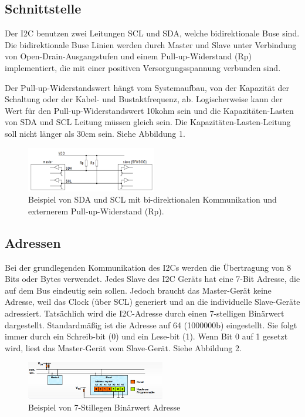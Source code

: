 \documentclass[conference]{IEEEtran}
\begin{document}
\subsection{Schnittstelle}
Der I2C benutzen zwei Leitungen SCL und SDA, welche bidirektionale Buse sind. Die bidirektionale Buse Linien werden durch Master und Slave unter Verbindung von Open-Drain-Ausgangstufen und einem Pull-up-Widerstand (Rp) implementiert, die mit einer positiven Versorgungsspannung verbunden sind.

Der Pull-up-Widerstandswert hängt vom Systemaufbau, von der Kapazität der Schaltung oder der Kabel- und Bustaktfrequenz, ab. Logischerweise kann der Wert für den Pull-up-Widerstandswert 10kohm sein und die Kapazitäten-Lasten von SDA und SCL Leitung müssen gleich sein. Die Kapazitäten-Lasten-Leitung soll nicht länger als 30cm sein.  Siehe Abbildung 1.

\begin{figure}
	\centering
	\includegraphics[width=0.7\linewidth]{fig9}
	\caption{Beispiel von SDA und SCL mit bi-direktionalen Kommunikation und externerem Pull-up-Widerstand (Rp).}
	\label{fig:fig9}
\end{figure}


\subsection{Adressen}

Bei  der grundlegenden Kommunikation des I2Cs werden die Übertragung von 8 Bits oder Bytes verwendet. Jedes Slave des I2C Geräts hat eine 7-Bit Adresse, die auf dem Bus eindeutig sein sollen. Jedoch braucht das Master-Gerät keine Adresse, weil das Clock (über SCL) generiert und an die individuelle Slave-Geräte adressiert. 
Tatsächlich  wird die I2C-Adresse durch einen 7-stelligen Binärwert dargestellt. Standardmäßig ist die Adresse auf 64 (1000000b) eingestellt. Sie folgt immer durch ein Schreib-bit (0) und ein Lese-bit (1). Wenn Bit 0 auf 1 gesetzt wird, liest das Master-Gerät vom Slave-Gerät. 
Siehe Abbildung 2.

\begin{figure}
	\centering
	\includegraphics[width=0.7\linewidth]{fig10}
	\caption{Beispiel von 7-Stillegen Binärwert Adresse}
	\label{fig:fig10}
\end{figure}
\end{document}
